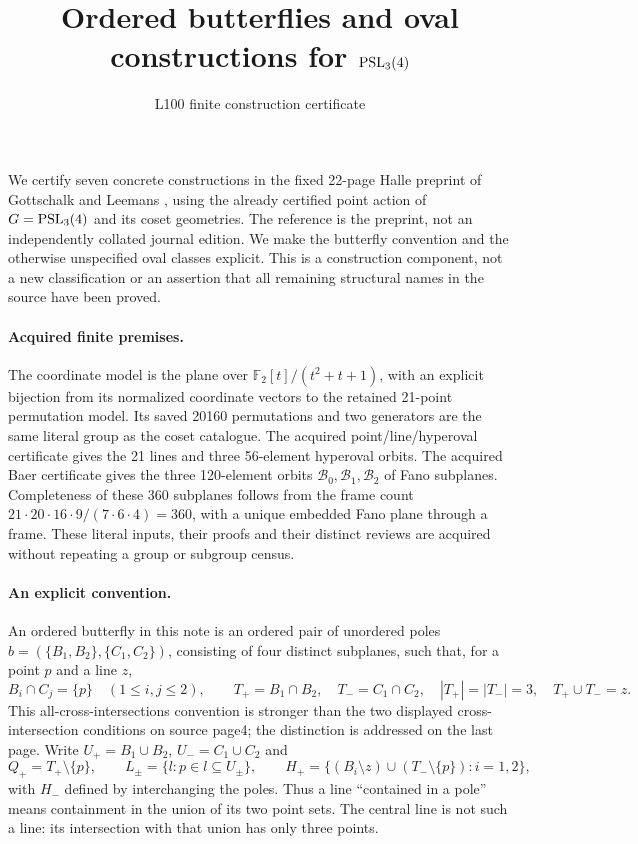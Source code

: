 \documentclass[11pt]{article}
\title{Ordered butterflies and oval constructions for $\operatorname{PSL}_3(4)$}
\author{L100 finite construction certificate}\date{}
\newcommand{\orb}{\mathcal B}\newcommand{\hyp}{\mathcal H}
\begin{document}
\maketitle
We certify seven concrete constructions in the fixed 22-page Halle preprint
of Gottschalk and Leemans \cite{GL}, using the already certified point action
of $G=\operatorname{PSL}_3(4)$ and its coset geometries. The reference is the preprint,
not an independently collated journal edition. We make the butterfly
convention and the otherwise unspecified oval classes explicit. This is
a construction component, not a new classification or an assertion that
all remaining structural names in the source have been proved.

\paragraph{Acquired finite premises.}
The coordinate model is the plane over
$\mathbb F_2[t]/(t^2+t+1)$, with an explicit bijection from its normalized
coordinate vectors to the retained 21-point permutation model. Its saved
20160 permutations and two generators are the same literal group as the
coset catalogue. The acquired point/line/hyperoval certificate gives the
21 lines and three 56-element hyperoval orbits. The acquired Baer certificate
gives the three 120-element orbits $\orb_0,\orb_1,\orb_2$ of Fano subplanes.
Completeness of these 360 subplanes follows from the frame count
$21\cdot20\cdot16\cdot9/(7\cdot6\cdot4)=360$, with a unique embedded
Fano plane through a frame. These literal inputs, their proofs and their
distinct reviews are acquired without repeating a group or subgroup census.

\paragraph{An explicit convention.}
An ordered butterfly in this note is an ordered pair of unordered poles
$b=(\{B_1,B_2\},\{C_1,C_2\})$, consisting of four distinct subplanes,
such that, for a point $p$ and a line $z$,
\[
 B_i\cap C_j=\{p\}\quad(1\leq i,j\leq2),\qquad
 T_+=B_1\cap B_2,\quad T_-=C_1\cap C_2,
 \quad |T_+|=|T_-|=3,\quad T_+\cup T_-=z.                 \tag{1}
\]
This all-cross-intersections convention is stronger than the two displayed
cross-intersection conditions on source page4; the distinction is addressed
on the last page. Write $U_+=B_1\cup B_2$, $U_-=C_1\cup C_2$ and
\[
 Q_+=T_+\setminus\{p\},\qquad
 L_\pm=\{l:p\in l\subseteq U_\pm\},\qquad
 H_+=\{(B_i\setminus z)\cup(T_-\setminus\{p\}):i=1,2\},
\]
with $H_-$ defined by interchanging the poles. Thus a line ``contained in
a pole'' means containment in the union of its two point sets. The central
line is not such a line: its intersection with that union has only three points.
\end{document}
